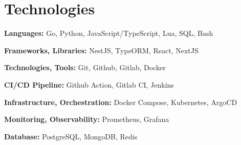 \section{Technologies}

\begin{onecolentry}
	\textbf{Languages:}
	Go,
	Python,
	JavaScript/TypeScript,
	Lua,
	SQL,
	Bash
\end{onecolentry}

\vspace{0.2 cm}

\begin{onecolentry}
	\textbf{Frameworks, Libraries:}
	NestJS,
	TypeORM,
	React,
	NextJS
\end{onecolentry}

\vspace{0.2 cm}

\begin{onecolentry}
	\textbf{Technologies, Tools:}
	Git,
	Github,
	Gitlab,
	Docker
\end{onecolentry}

\vspace{0.2 cm}

\begin{onecolentry}
	\textbf{CI/CD Pipeline:}
	Github Action,
	Gitlab CI,
	Jenkins
\end{onecolentry}

\vspace{0.2 cm}

\begin{onecolentry}
	\textbf{Infrastructure, Orchestration:}
	Docker Compose,
	Kubernetes,
	ArgoCD
\end{onecolentry}

\vspace{0.2 cm}

\begin{onecolentry}
	\textbf{Monitoring, Observability:}
	Prometheus,
	Grafana
\end{onecolentry}

%
%
%

\vspace{0.2 cm}

\begin{onecolentry}
	\textbf{Database:}
	PostgreSQL,
	MongoDB,
	Redis
\end{onecolentry}
